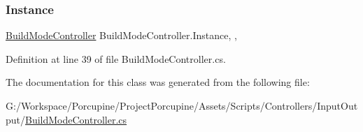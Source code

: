 \subsubsection{\texorpdfstring{Instance}{Instance}}
{\footnotesize\ttfamily \hyperlink{class_build_mode_controller}{Build\+Mode\+Controller} Build\+Mode\+Controller.\+Instance\hspace{0.3cm}{\ttfamily [static]}, {\ttfamily [get]}, {}}



Definition at line 39 of file Build\+Mode\+Controller.\+cs.



The documentation for this class was generated from the following file\+:\begin{DoxyCompactItemize}
\item 
G\+:/\+Workspace/\+Porcupine/\+Project\+Porcupine/\+Assets/\+Scripts/\+Controllers/\+Input\+Output/\hyperlink{_build_mode_controller_8cs}{Build\+Mode\+Controller.\+cs}\end{DoxyCompactItemize}
